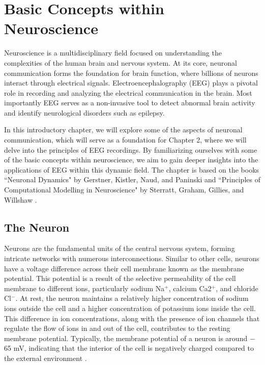 \documentclass[a4paper, UKenglish, 11pt]{uiomaster}
\begin{document}
\chapter{Basic Concepts within Neuroscience} \label{chap:intro_neuro}

Neuroscience is a multidisciplinary field focused on understanding the complexities of the human brain and nervous system. At its core, neuronal communication forms the foundation for brain function, where billions of neurons interact through electrical signals. Electroencephalography (EEG) plays a pivotal role in recording and analyzing the electrical communication in the brain. Most importantly EEG serves as a non-invasive tool to detect abnormal brain activity and identify neurological disorders such as epilepsy.

In this introductory chapter, we will explore some of the aspects of neuronal communication, which will serve as a foundation for Chapter 2, where we will delve into the principles of EEG recordings. By familiarizing ourselves with some of the basic concepts within neuroscience, we aim to gain deeper insights into the applications of EEG within this dynamic field. The chapter is based on the books ``Neuronal Dynamics" by Gerstner, Kistler, Naud, and Paninski \cite{gerstner2014neuronal} and ``Principles of Computational Modelling in Neuroscience" by Sterratt, Graham, Gillies, and Willshaw \cite{sterratt2011principles}.



\section{The Neuron}
Neurons are the fundamental units of the central nervous system, forming intricate networks with numerous interconnections. Similar to other cells, neurons have a voltage difference across their cell membrane known as the membrane potential. This potential is a result of the selective permeability of the cell membrane to different ions, particularly sodium Na$^+$, calcium Ca2$^+$, and chloride Cl$^-$. At rest, the neuron maintains a relatively higher concentration of sodium ions outside the cell and a higher concentration of potassium ions inside the cell. This difference in ion concentrations, along with the presence of ion channels that regulate the flow of ions in and out of the cell, contributes to the resting membrane potential. Typically, the membrane potential of a neuron is around $-$65 mV, indicating that the interior of the cell is negatively charged compared to the external environment \cite{sterratt2011principles}.
\end{document}
